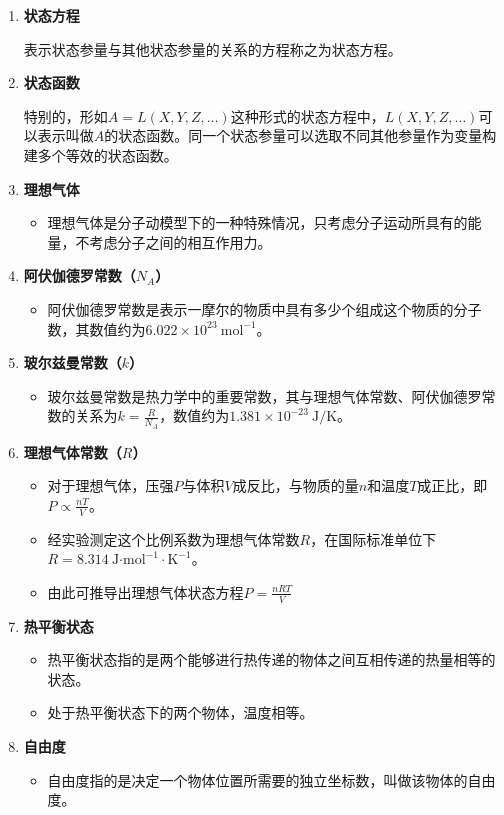\documentclass{article}
\begin{document}
\begin{enumerate}[label=\arabic*.]
		\item \textbf{状态方程}
		
			表示状态参量与其他状态参量的关系的方程称之为状态方程。
		
		\item \textbf{状态函数}
		
		特别的，形如\(A = L(X,Y,Z,\dots)\)这种形式的状态方程中，\(L(X,Y,Z,\dots)\)可以表示叫做\(A\)的状态函数。同一个状态参量可以选取不同其他参量作为变量构建多个等效的状态函数。

		
		\item \textbf{理想气体}
		\begin{itemize}
			\item 理想气体是分子动模型下的一种特殊情况，只考虑分子运动所具有的能量，不考虑分子之间的相互作用力。
		\end{itemize}
		
		\item \textbf{阿伏伽德罗常数（\(N_A\)）}
		\begin{itemize}
			\item 阿伏伽德罗常数是表示一摩尔的物质中具有多少个组成这个物质的分子数，其数值约为\(6.022×10^{23}\ \text{mol}^{-1}\)。
		\end{itemize}
		
		\item \textbf{玻尔兹曼常数（\(k\)）}
		\begin{itemize}
			\item 玻尔兹曼常数是热力学中的重要常数，其与理想气体常数、阿伏伽德罗常数的关系为\(k=\frac{R}{N_A}\)，数值约为\(1.381×10^{-23}\ \text{J/K}\)。
		\end{itemize}
		
		\item \textbf{理想气体常数（\(R\)）}
		\begin{itemize}
			\item 对于理想气体，压强\(P\)与体积\(V\)成反比，与物质的量\(n\)和温度\(T\)成正比，即\(P\propto\frac{nT}{V}\)。
			\item 经实验测定这个比例系数为理想气体常数\(R\)，在国际标准单位下\(R = 8.314\ \text{J·mol}^{-1}·\text{K}^{-1}\)。
			\item 由此可推导出理想气体状态方程\(P=\frac{nRT}{V}\)
		\end{itemize}
		
		\item \textbf{热平衡状态}
		\begin{itemize}
			\item 热平衡状态指的是两个能够进行热传递的物体之间互相传递的热量相等的状态。
			\item 处于热平衡状态下的两个物体，温度相等。
		\end{itemize}
		
		\item \textbf{自由度}
		\begin{itemize}
			\item 自由度指的是决定一个物体位置所需要的独立坐标数，叫做该物体的自由度。
		\end{itemize}
	\end{enumerate}
	
\end{document}
